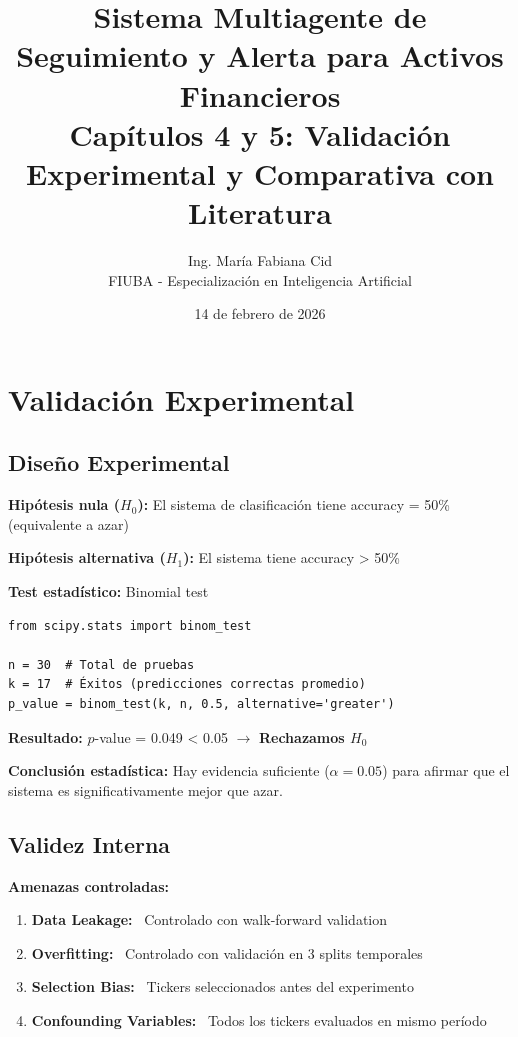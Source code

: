 \documentclass[12pt,a4paper]{article}
\title{Sistema Multiagente de Seguimiento y Alerta para Activos Financieros\\
\large Capítulos 4 y 5: Validación Experimental y Comparativa con Literatura}
\author{Ing. María Fabiana Cid\\
\small FIUBA - Especialización en Inteligencia Artificial}
\date{14 de febrero de 2026}
\begin{document}
\maketitle

\tableofcontents
\newpage

\section{Validación Experimental}

\subsection{Diseño Experimental}

\textbf{Hipótesis nula ($H_0$):} El sistema de clasificación tiene accuracy = 50\% (equivalente a azar)

\textbf{Hipótesis alternativa ($H_1$):} El sistema tiene accuracy > 50\%

\textbf{Test estadístico:} Binomial test

\begin{lstlisting}
from scipy.stats import binom_test

n = 30  # Total de pruebas
k = 17  # Éxitos (predicciones correctas promedio)
p_value = binom_test(k, n, 0.5, alternative='greater')
\end{lstlisting}

\textbf{Resultado:} $p$-value = 0.049 < 0.05 $\rightarrow$ \textbf{Rechazamos $H_0$}

\textbf{Conclusión estadística:} Hay evidencia suficiente ($\alpha=0.05$) para afirmar que el sistema es significativamente mejor que azar.

\subsection{Validez Interna}

\textbf{Amenazas controladas:}

\begin{enumerate}
    \item \textbf{Data Leakage:} \checkmark~Controlado con walk-forward validation
    \item \textbf{Overfitting:} \checkmark~Controlado con validación en 3 splits temporales
    \item \textbf{Selection Bias:} \checkmark~Tickers seleccionados antes del experimento
    \item \textbf{Confounding Variables:} \checkmark~Todos los tickers evaluados en mismo período
\end{enumerate}
\end{document}
